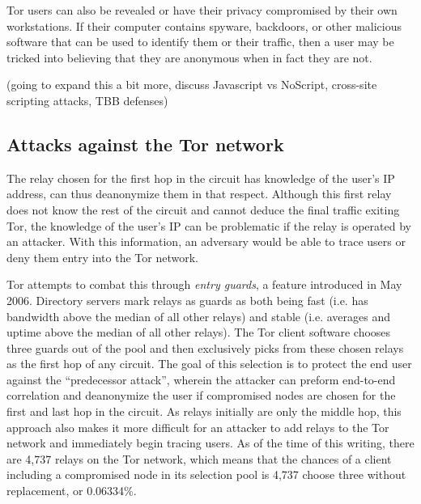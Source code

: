 \documentclass[journal]{IEEEtran}
\begin{document}
Tor users can also be revealed or have their privacy compromised by their own workstations. If their computer contains spyware, backdoors, or other malicious software that can be used to identify them or their traffic, then a user may be tricked into believing that they are anonymous when in fact they are not.

(going to expand this a bit more, discuss Javascript vs NoScript, cross-site scripting attacks, TBB defenses)

\subsection{Attacks against the Tor network}


The relay chosen for the first hop in the circuit has knowledge of the user's IP address, can thus deanonymize them in that respect. Although this first relay does not know the rest of the circuit and cannot deduce the final traffic exiting Tor, the knowledge of the user's IP can be problematic if the relay is operated by an attacker. With this information, an adversary would be able to trace users or deny them entry into the Tor network.

Tor attempts to combat this through \textit{entry guards}, a feature introduced in May 2006. Directory servers mark relays as guards as both being fast (i.e. has bandwidth above the median of all other relays) and stable (i.e. averages and uptime above the median of all other relays). The Tor client software chooses three guards out of the pool and then exclusively picks from these chosen relays as the first hop of any circuit.\cite{Xin2009} The goal of this selection is to protect the end user against the ``predecessor attack'', wherein the attacker can preform end-to-end correlation and deanonymize the user if compromised nodes are chosen for the first and last hop in the circuit.\cite{Wright2004} As relays initially are only the middle hop, this approach also makes it more difficult for an attacker to add relays to the Tor network and immediately begin tracing users. As of the time of this writing, there are 4,737 relays on the Tor network, which means that the chances of a client including a compromised node in its selection pool is 4,737 choose three without replacement, or 0.06334\%.
\end{document}
